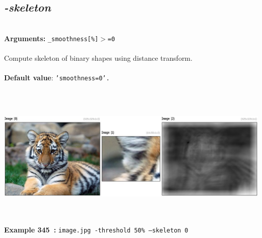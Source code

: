 \documentclass[a4paper,11pt,twoside]{book}
\begin{document}
\subsection{\emph{-skeleton} }\vspace*{-0.5em}
~\\\textbf{Arguments: } 
{\small \texttt{\_smoothness[\%]$>$=0}}\\~\\
Compute skeleton of binary shapes using distance transform.
~\\~\\\textbf{Default value}: {\small \texttt{'smoothness=0'.}}
\begin{center}\includegraphics[keepaspectratio=true,height=7cm,width=\textwidth]{img/gmic_def345.jpg}\\
{\footnotesize \textbf{Example 345~:} \texttt{image.jpg -threshold 50\% --skeleton 0}}
\end{center}
\end{document}
